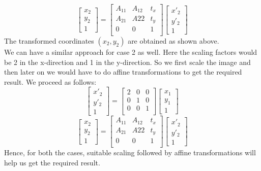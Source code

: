 \documentclass{article}
\begin{document}
\begin{enumerate}
\begin{equation}
\begin{bmatrix}
        x_2 \\
        y_2 \\
        1
    \end{bmatrix}
          =
    \begin{bmatrix}
    A_{11} & A_{12} & t_x \\
    A_{21} & A{22} & t_y \\
    0 & 0 & 1 \\
    \end{bmatrix}
    \begin{bmatrix}
        x'_2 \\
        y'_2 \\
        1 
    \end{bmatrix}
\end{equation}
The transformed coordinates $(x_2,y_2)$ are obtained as shown above.\\
We can have a similar approach for case 2 as well. Here the scaling factors would be 2 in the x-direction and 1 in the y-direction. So we first scale the image and then later on we would have to do affine transformations to get the required result. We proceed as follows:
\begin{equation}
     \begin{bmatrix}
        x'_2 \\
        y'_2 \\
        1
    \end{bmatrix}
          =
    \begin{bmatrix}
    2 & 0 & 0 \\
    0 & 1 & 0 \\
    0 & 0 & 1 \\
    \end{bmatrix}
    \begin{bmatrix}
        x_1 \\
        y_1 \\
        1 
    \end{bmatrix}
\end{equation}
\begin{equation}
     \begin{bmatrix}
        x_2 \\
        y_2 \\
        1
    \end{bmatrix}
          =
    \begin{bmatrix}
    A_{11} & A_{12} & t_x \\
    A_{21} & A{22} & t_y \\
    0 & 0 & 1 \\
    \end{bmatrix}
    \begin{bmatrix}
        x'_2 \\
        y'_2 \\
        1 
    \end{bmatrix}
\end{equation}
Hence, for both the cases, suitable scaling followed by affine transformations will help us get the required result.


\end{enumerate}
\end{document}
